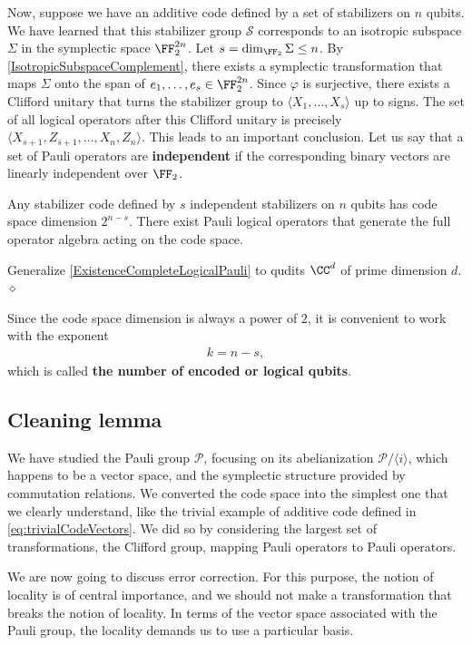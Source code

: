 Now, suppose we have an additive code defined by a set of stabilizers on $n$ qubits.
We have learned that this stabilizer group $\mathcal S$ 
corresponds to an isotropic subspace $\Sigma$ in the symplectic space $\FF_2^{2n}$.
Let $s = \dim_{\FF_2} \Sigma \le n$.
By \ref{IsotropicSubspaceComplement},
there exists a symplectic transformation that maps $\Sigma$ onto the span of $e_1, \ldots, e_s \in \FF_2^{2n}$.
Since $\varphi$ is surjective, there exists a Clifford unitary that turns the stabilizer group
to $\langle X_1, \ldots, X_s \rangle$ up to signs.
The set of all logical operators after this Clifford unitary is precisely $\langle X_{s+1}, Z_{s+1}, \ldots, X_n, Z_n \rangle$.
This leads to an important conclusion.
Let us say that a set of Pauli operators are {\bf independent} if
the corresponding binary vectors are linearly independent over $\FF_2$.
\begin{thm}
Any stabilizer code defined by $s$ independent stabilizers on $n$ qubits
has code space dimension $2^{n-s}$.
There exist Pauli logical operators that generate the full operator algebra acting on the code space.
\label{ExistenceCompleteLogicalPauli}
\end{thm}
\begin{exc}
Generalize \ref{ExistenceCompleteLogicalPauli}
to qudits $\CC^d$ of prime dimension $d$.
\hfill $\diamond$ \end{exc}
Since the code space dimension is always a power of $2$,
it is convenient to work with the exponent 
\begin{align}
k = n - s,
\end{align}
which is called {\bf the number of encoded or logical qubits}.

\subsection{Cleaning lemma}

We have studied the Pauli group $\mathcal P$,
focusing on its abelianization $\mathcal P / \langle i \rangle$,
which happens to be a vector space,
and the symplectic structure provided by commutation relations.
We converted the code space into the simplest one that we clearly understand,
like the trivial example of additive code defined in \eqref{eq:trivialCodeVectors}.
We did so by considering the largest set of transformations,
the Clifford group,
mapping Pauli operators to Pauli operators.

We are now going to discuss error correction.
For this purpose, the notion of locality is of central importance,
and we should not make a transformation that breaks the notion of locality.
In terms of the vector space associated with the Pauli group,
the locality demands us to use a particular basis.

